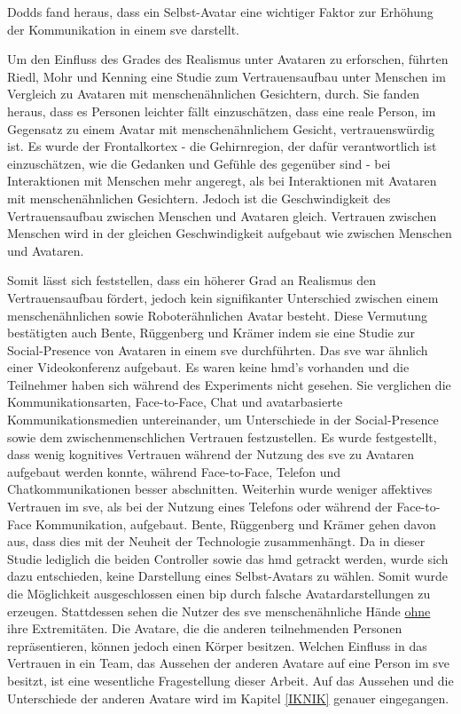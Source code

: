 \documentclass[a4paper,11pt]{article}%
\renewcommand{\\}{\vspace*{0.5\baselineskip} \newline}
\begin{document}
Dodds fand heraus, dass ein Selbst-Avatar eine wichtiger Faktor zur Erhöhung der Kommunikation in einem \ac{sve} darstellt. \citep[1-11]{dodds2011talk}

Um den Einfluss des Grades des Realismus unter Avataren zu erforschen, führten Riedl, Mohr und Kenning \cite{riedl2014trusting} eine Studie zum Vertrauensaufbau unter Menschen im Vergleich zu Avataren mit menschenähnlichen Gesichtern, durch. Sie fanden heraus, dass es Personen leichter fällt einzuschätzen, dass eine reale Person, im Gegensatz zu einem Avatar mit menschenähnlichem Gesicht, vertrauenswürdig ist. Es wurde der Frontalkortex - die Gehirnregion, der dafür verantwortlich ist einzuschätzen, wie die Gedanken und Gefühle des gegenüber sind - bei Interaktionen mit Menschen mehr angeregt, als bei Interaktionen mit Avataren mit menschenähnlichen Gesichtern.
Jedoch ist die Geschwindigkeit des Vertrauensaufbau zwischen Menschen und Avataren gleich. Vertrauen zwischen Menschen wird in der gleichen Geschwindigkeit aufgebaut wie zwischen Menschen und Avataren. \cite{riedl2014trusting}

Somit lässt sich feststellen, dass ein höherer Grad an Realismus den Vertrauensaufbau fördert, jedoch kein signifikanter Unterschied zwischen einem menschenähnlichen sowie Roboterähnlichen Avatar besteht. Diese Vermutung bestätigten auch Bente, Rüggenberg und Krämer \citep[p.54-59]{bente2004social} indem sie eine Studie zur Social-Presence von Avataren in einem \ac{sve} durchführten. Das \ac{sve} war ähnlich einer Videokonferenz aufgebaut. Es waren keine \ac{hmd}'s vorhanden und die Teilnehmer haben sich während des Experiments nicht gesehen. Sie verglichen die Kommunikationsarten, Face-to-Face, Chat und avatarbasierte Kommunikationsmedien untereinander, um Unterschiede in der Social-Presence sowie dem zwischenmenschlichen Vertrauen festzustellen.
Es wurde festgestellt, dass wenig kognitives Vertrauen während der Nutzung des \ac{sve} zu Avataren aufgebaut werden konnte, während Face-to-Face, Telefon und Chatkommunikationen besser abschnitten. Weiterhin wurde weniger affektives Vertrauen im \ac{sve}, als bei der Nutzung eines Telefons oder während der Face-to-Face Kommunikation, aufgebaut.
Bente, Rüggenberg und Krämer \citep[p.54-59]{bente2004social} gehen davon aus, dass dies mit der Neuheit der Technologie zusammenhängt.\\
Da in dieser Studie lediglich die beiden Controller sowie das \ac{hmd} getrackt werden, wurde sich dazu entschieden, keine Darstellung eines Selbst-Avatars zu wählen. Somit wurde die Möglichkeit ausgeschlossen einen \ac{bip} durch falsche Avatardarstellungen zu erzeugen. Stattdessen sehen die Nutzer des \ac{sve} menschenähnliche Hände \underline{ohne} ihre Extremitäten.\\
Die Avatare, die die \dq{}anderen\dq{} teilnehmenden Personen repräsentieren, können jedoch einen Körper besitzen.
Welchen Einfluss in das Vertrauen in ein Team, das Aussehen der \dq{}anderen\dq{} Avatare auf eine Person im \ac{sve} besitzt, ist eine wesentliche Fragestellung dieser Arbeit. Auf das Aussehen und die Unterschiede der \dq{}anderen\dq{} Avatare wird im Kapitel \ref{IKNIK} genauer eingegangen.
\end{document}
